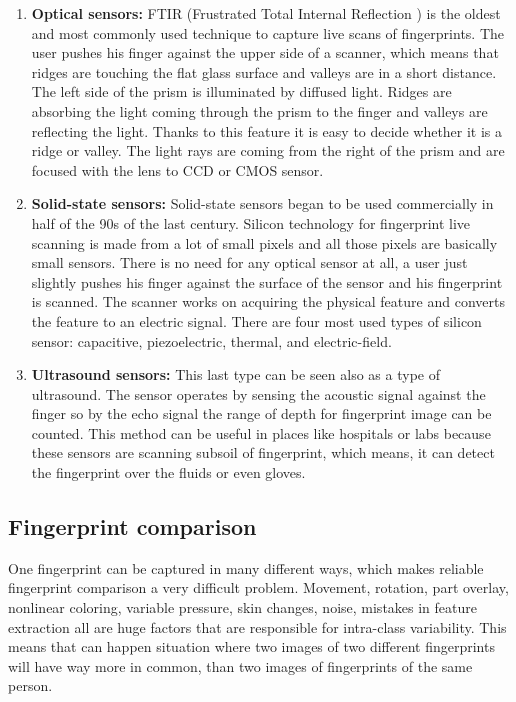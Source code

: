 \begin{enumerate}
	\item \textbf{Optical sensors:} 
	FTIR (Frustrated Total Internal Reflection ) is the oldest and most commonly used technique to capture live scans of fingerprints. The user pushes his finger against the upper side of a scanner, which means that ridges are touching the flat glass surface and valleys are in a short distance. The left side of the prism is illuminated by diffused light. Ridges are absorbing the light coming through the prism to the finger and valleys are reflecting the light. Thanks to this feature it is easy to decide whether it is a ridge or valley. The light rays are coming from the right of the prism and are focused with the lens to CCD or CMOS sensor.\cite{jain2007handbook}     
    
    \item \textbf{Solid-state sensors:}
    Solid-state sensors began to be used commercially in half of the 90s of the last century. Silicon technology for fingerprint live scanning is made from a lot of small pixels and all those pixels are basically small sensors. There is no need for any optical sensor at all, a user just slightly pushes his finger against the surface of the sensor and his fingerprint is scanned. The scanner works on acquiring the physical feature and converts the feature to an electric signal. There are four most used types of silicon sensor: capacitive, piezoelectric, thermal, and electric-field.\cite{jain2007handbook}
    
    \item \textbf{Ultrasound sensors:}
    This last type can be seen also as a type of ultrasound. The sensor operates by sensing the acoustic signal against the finger so by the echo signal the range of depth for fingerprint image can be counted. This method can be useful in places like hospitals or labs because these sensors are scanning subsoil of fingerprint, which means, it can detect the fingerprint over the fluids or even gloves.\cite{jain2007handbook}\cite{maltoni2009handbook}
\end{enumerate}

\subsection{Fingerprint comparison}
One fingerprint can be captured in many different ways, which makes reliable fingerprint comparison a very difficult problem. Movement, rotation, part overlay, nonlinear coloring, variable pressure, skin changes, noise, mistakes in feature extraction all are huge factors that are responsible for intra-class variability. This means that can happen situation where two images of two different fingerprints will have way more in common, than two images of fingerprints of the same person.\cite{jain2007handbook}\cite{maltoni2009handbook}

